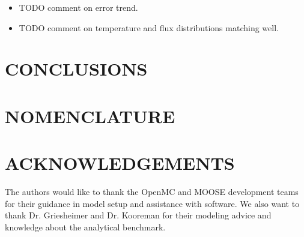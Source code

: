 \documentclass[letterpaper]{mc2023}
\begin{document}
\begin{itemize}
    \item TODO comment on error trend.
    \item TODO comment on temperature and flux distributions matching well.
\end{itemize}


\section{CONCLUSIONS}


\section*{NOMENCLATURE}

\printglossary[title={Nomenclature}, nonumberlist, nopostdot]

\section*{ACKNOWLEDGEMENTS}
The authors would like to thank the OpenMC and MOOSE development teams for their guidance in model setup and assistance
with software. We also want to thank Dr. Griesheimer and Dr. Kooreman for their modeling advice and knowledge about the
analytical benchmark.

\setlength{\baselineskip}{12pt}


\setlength{\baselineskip}{12pt}
\end{document}
